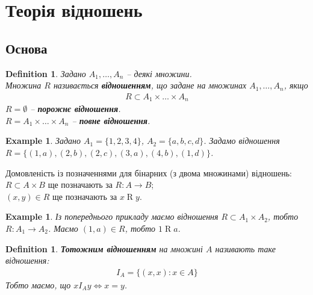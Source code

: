 \documentclass[a4paper, 14pt]{extarticle}
\theoremstyle{theoremdd}
\theoremstyle{theoremdd}
\newtheorem{definition}[theorem]{Definition}
\theoremstyle{theoremdd}
\theoremstyle{theoremdd}
\theoremstyle{theoremdd}
\newtheorem{example}[theorem]{Example}
\theoremstyle{theoremdd}
\theoremstyle{theoremdd}
\theoremstyle{theoremdd}
\theoremstyle{theoremdd}
\theoremstyle{theoremdd}
\theoremstyle{theoremdd}
\theoremstyle{theoremdd}
\theoremstyle{theoremdd}
\theoremstyle{theoremdd}
\theoremstyle{theoremdd}
\begin{document}
\section{Теорія відношень}
\subsection{Основа}
\begin{definition}
Задано $A_1,\dots,A_n$ -- деякі множини.\\
Множина $R$ називається \textbf{відношенням}, що задане на множинах $A_1,\dots,A_n$, якщо
\begin{align*}
R \subset A_1 \times \dots \times A_n
\end{align*}
$R = \emptyset$ -- \textbf{порожнє відношення}. \\
$R = A_1 \times \dots \times A_n$ -- \textbf{повне відношення}.
\end{definition}

\begin{example}
Задано $A_1 = \{1,2,3,4\}$, $A_2 = \{a,b,c,d\}$. Задамо відношення $R = \{(1,a), (2,b), (2,c), (3,a), (4,b), (1,d) \}$.
\end{example}

Домовленість із позначеннями для бінарних (з двома множинами) відношень:\\
$R \subset A \times B$ ще позначають за $R \colon A \to B$;\\
$(x,y) \in R$ ще позначають за $x \mathrel{R} y$.

\begin{example}
Із попереднього прикладу маємо відношення $R \subset A_1 \times A_2$, тобто $R \colon A_1 \to A_2$. Маємо $(1,a) \in R$, тобто $1 \mathrel{R} a$.
\end{example}

\begin{definition}
\textbf{Тотожним відношенням} на множині $A$ називають таке відношення:
\begin{align*}
I_A = \{(x,x): x \in A\}
\end{align*}
Тобто маємо, що $x \mathrel{I_A} y \iff x = y$.
\end{definition}
\end{document}
